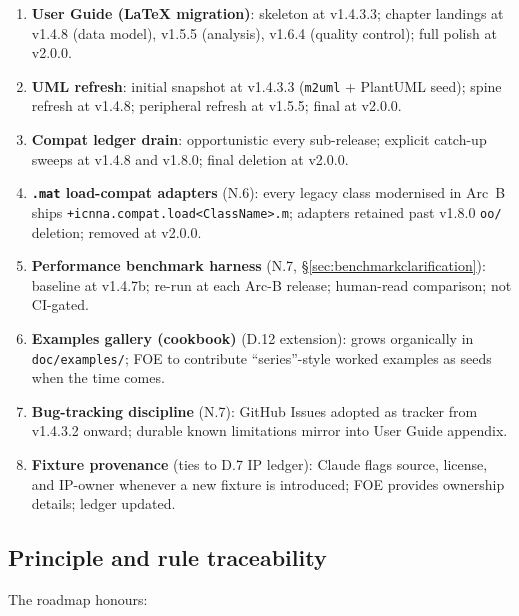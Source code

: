 \documentclass[11pt,a4paper]{article}
\begin{document}
\begin{enumerate}[label=\textbf{T\arabic*.}]
    \item \textbf{User Guide (LaTeX migration)}: skeleton at v1.4.3.3; chapter landings at v1.4.8 (data model), v1.5.5 (analysis), v1.6.4 (quality control); full polish at v2.0.0.
    \item \textbf{UML refresh}: initial snapshot at v1.4.3.3 (\texttt{m2uml} + PlantUML seed); spine refresh at v1.4.8; peripheral refresh at v1.5.5; final at v2.0.0.
    \item \textbf{Compat ledger drain}: opportunistic every sub-release; explicit catch-up sweeps at v1.4.8 and v1.8.0; final deletion at v2.0.0.
    \item \textbf{\texttt{.mat} load-compat adapters} (N.6): every legacy class modernised in Arc~B ships \texttt{+icnna.compat.load<ClassName>.m}; adapters retained past v1.8.0 \texttt{oo/} deletion; removed at v2.0.0.
    \item \textbf{Performance benchmark harness} (N.7, \S\ref{sec:benchmarkclarification}): baseline at v1.4.7b; re-run at each Arc-B release; human-read comparison; not CI-gated.
    \item \textbf{Examples gallery (cookbook)} (D.12 extension): grows organically in \texttt{doc/examples/}; FOE to contribute ``series''-style worked examples as seeds when the time comes.
    \item \textbf{Bug-tracking discipline} (N.7): GitHub Issues adopted as tracker from v1.4.3.2 onward; durable known limitations mirror into User Guide appendix.
    \item \textbf{Fixture provenance} (ties to D.7 IP ledger): Claude flags source, license, and IP-owner whenever a new fixture is introduced; FOE provides ownership details; ledger updated.
\end{enumerate}

\subsection{Principle and rule traceability}

The roadmap honours:
\end{document}
